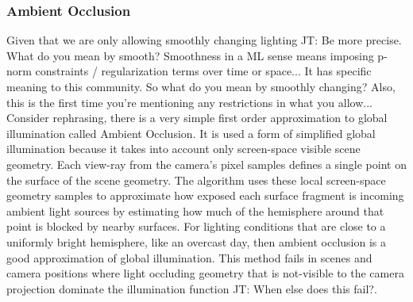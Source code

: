 \documentclass[10pt,twocolumn,letterpaper]{article}
\newcommand{\tompson}[1]{{\color{green} JT: #1}}
\begin{document}
\subsubsection{Ambient Occlusion}

Given that we are only allowing smoothly changing lighting \tompson{Be more precise. What do you mean by smooth? Smoothness in a ML sense means imposing p-norm constraints / regularization terms over time or space... It has specific meaning to this community. So what do you mean by smoothly changing? Also, this is the first time you're mentioning any restrictions in what you allow... Consider rephrasing}, there is a very simple first order approximation to global illumination called Ambient Occlusion. It is used a form of simplified global illumination because it takes into account only screen-space visible  scene geometry\cite{Miller:1994:EAL:192161.192244}.  Each view-ray from the camera's pixel samples defines a single point on the surface of the scene geometry. The algorithm uses these local screen-space geometry samples to approximate how exposed each surface fragment is incoming ambient light sources by estimating how much of the hemisphere around that point is blocked by nearby surfaces. For lighting conditions that are close to a uniformly bright hemisphere, like an overcast day, then ambient occlusion is a good approximation of global illumination. This method fails in scenes and camera positions where light occluding geometry that is not-visible to the camera projection dominate the illumination function \tompson{When else does this fail?}.   \\%
\end{document}
